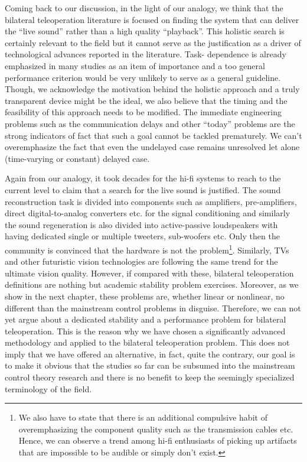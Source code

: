 Coming back to our discussion, in the light of our analogy, we think that the bilateral teleoperation literature is focused on finding
the system that can deliver the \enquote{live sound} rather than a high quality \enquote{playback}. This holistic search is certainly
relevant to the field but it cannot serve as the justification as a driver of technological advances reported in the literature. Task-%
dependence is already emphasized in many studies as an item of importance and a too general performance criterion would be very unlikely
to serve as a general guideline. Though, we acknowledge the motivation behind the holistic approach and a truly transparent device 
might be the ideal, we also believe that the timing and the feasibility of this approach needs to be modified. The immediate engineering 
problems such as the communication delays and other \enquote{today} problems are the strong indicators of fact that such a goal cannot 
be tackled prematurely. We can't overemphasize the fact that even the undelayed case remains unresolved let alone (time-varying 
or constant) delayed case. 


Again from our analogy, it took decades for the hi-fi systems to reach to the current level to claim that
a search for the live sound is justified. The sound reconstruction task is divided into components such as amplifiers, pre-amplifiers, 
direct digital-to-analog converters etc. for the signal conditioning and similarly the sound regeneration is also divided into active-passive 
loudspeakers with having dedicated single or multiple tweeters, sub-woofers etc. Only then the community is convinced that the hardware 
is not the problem\footnote{We also
have to state that there is an additional compulsive habit of overemphasizing the component quality such as the transmission cables etc. 
Hence, we can observe a trend among hi-fi enthusiasts of picking up artifacts that are impossible to be audible or simply don't exist.}.
Similarly, TVs and other futuristic vision technologies are following the same trend for the ultimate vision quality. However, if compared 
with these, bilateral teleoperation definitions are nothing but academic stability problem exercises. Moreover, as we show in the next
chapter, these problems are, whether linear or nonlinear, no different than the mainstream control problems in disguise. Therefore, we
can not yet argue about a dedicated stability and a performance problem for bilateral teleoperation. This is the reason why we have 
chosen a significantly advanced methodology and applied to the bilateral teleoperation problem. This does not imply that we have offered
an alternative, in fact, quite the contrary, our goal is to make it obvious that the studies so far can be subsumed into the mainstream 
control theory research and there is no benefit to keep the seemingly specialized terminology of the field. 



